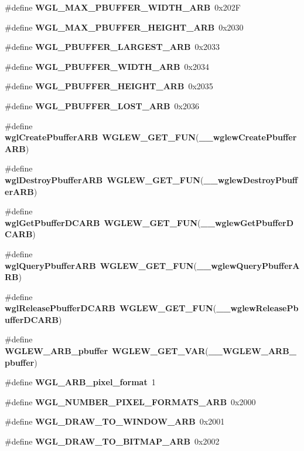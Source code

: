 \begin{DoxyCompactItemize}
\item 
\#define {\bf W\+G\+L\+\_\+\+M\+A\+X\+\_\+\+P\+B\+U\+F\+F\+E\+R\+\_\+\+W\+I\+D\+T\+H\+\_\+\+A\+RB}~0x202F
\item 
\#define {\bf W\+G\+L\+\_\+\+M\+A\+X\+\_\+\+P\+B\+U\+F\+F\+E\+R\+\_\+\+H\+E\+I\+G\+H\+T\+\_\+\+A\+RB}~0x2030
\item 
\#define {\bf W\+G\+L\+\_\+\+P\+B\+U\+F\+F\+E\+R\+\_\+\+L\+A\+R\+G\+E\+S\+T\+\_\+\+A\+RB}~0x2033
\item 
\#define {\bf W\+G\+L\+\_\+\+P\+B\+U\+F\+F\+E\+R\+\_\+\+W\+I\+D\+T\+H\+\_\+\+A\+RB}~0x2034
\item 
\#define {\bf W\+G\+L\+\_\+\+P\+B\+U\+F\+F\+E\+R\+\_\+\+H\+E\+I\+G\+H\+T\+\_\+\+A\+RB}~0x2035
\item 
\#define {\bf W\+G\+L\+\_\+\+P\+B\+U\+F\+F\+E\+R\+\_\+\+L\+O\+S\+T\+\_\+\+A\+RB}~0x2036
\item 
\#define {\bf wgl\+Create\+Pbuffer\+A\+RB}~{\bf W\+G\+L\+E\+W\+\_\+\+G\+E\+T\+\_\+\+F\+UN}({\bf \+\_\+\+\_\+wglew\+Create\+Pbuffer\+A\+RB})
\item 
\#define {\bf wgl\+Destroy\+Pbuffer\+A\+RB}~{\bf W\+G\+L\+E\+W\+\_\+\+G\+E\+T\+\_\+\+F\+UN}({\bf \+\_\+\+\_\+wglew\+Destroy\+Pbuffer\+A\+RB})
\item 
\#define {\bf wgl\+Get\+Pbuffer\+D\+C\+A\+RB}~{\bf W\+G\+L\+E\+W\+\_\+\+G\+E\+T\+\_\+\+F\+UN}({\bf \+\_\+\+\_\+wglew\+Get\+Pbuffer\+D\+C\+A\+RB})
\item 
\#define {\bf wgl\+Query\+Pbuffer\+A\+RB}~{\bf W\+G\+L\+E\+W\+\_\+\+G\+E\+T\+\_\+\+F\+UN}({\bf \+\_\+\+\_\+wglew\+Query\+Pbuffer\+A\+RB})
\item 
\#define {\bf wgl\+Release\+Pbuffer\+D\+C\+A\+RB}~{\bf W\+G\+L\+E\+W\+\_\+\+G\+E\+T\+\_\+\+F\+UN}({\bf \+\_\+\+\_\+wglew\+Release\+Pbuffer\+D\+C\+A\+RB})
\item 
\#define {\bf W\+G\+L\+E\+W\+\_\+\+A\+R\+B\+\_\+pbuffer}~{\bf W\+G\+L\+E\+W\+\_\+\+G\+E\+T\+\_\+\+V\+AR}({\bf \+\_\+\+\_\+\+W\+G\+L\+E\+W\+\_\+\+A\+R\+B\+\_\+pbuffer})
\item 
\#define {\bf W\+G\+L\+\_\+\+A\+R\+B\+\_\+pixel\+\_\+format}~1
\item 
\#define {\bf W\+G\+L\+\_\+\+N\+U\+M\+B\+E\+R\+\_\+\+P\+I\+X\+E\+L\+\_\+\+F\+O\+R\+M\+A\+T\+S\+\_\+\+A\+RB}~0x2000
\item 
\#define {\bf W\+G\+L\+\_\+\+D\+R\+A\+W\+\_\+\+T\+O\+\_\+\+W\+I\+N\+D\+O\+W\+\_\+\+A\+RB}~0x2001
\item 
\#define {\bf W\+G\+L\+\_\+\+D\+R\+A\+W\+\_\+\+T\+O\+\_\+\+B\+I\+T\+M\+A\+P\+\_\+\+A\+RB}~0x2002
\item 

\end{DoxyCompactItemize}
